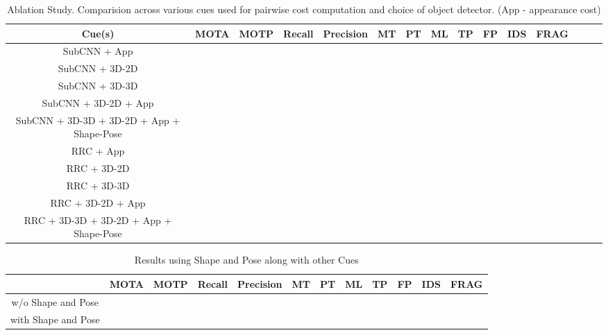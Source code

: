 \documentclass[letterpaper, 10 pt, conference]{ieeeconf}
\begin{document}
\begin{table*}[!hbt]
	\centering
    \caption{Ablation Study. Comparision across various cues used for pairwise cost computation and choice of object detector. (App - appearance cost)}
    \begin{adjustbox}{max width=\linewidth}
	\begin{tabular}{|c|c|c|c|c|c|c|c|c|c|c|c|c|c|c|}
		\hline 
        Cue(s) &  MOTA & MOTP & Recall & Precision & MT & PT & ML & TP & FP & IDS & FRAG \\
      	\hline\hline
        
		SubCNN + App &  &  &  &  &  &  &  &  &  &  &  \\
            \hline
		SubCNN + 3D-2D &  &  &  &  &  &  &  &  &  &  &  \\
             	\hline
		SubCNN + 3D-3D &  &  &  &  &  &  &  &  &  &  &  \\
      \hline
		SubCNN + 3D-2D + App &  &  &  &  &  &  &  &  &  &  &  \\
    	\hline
		SubCNN + 3D-3D + 3D-2D + App + Shape-Pose &  &  &  &  &  &  &  &  &  &  &  \\
        
        \hline\hline
    	
		RRC + App &  &  &  &  &  &  &  &  &  &  &  \\
            \hline
		RRC + 3D-2D &  &  &  &  &  &  &  &  &  &  &  \\
             	\hline
		RRC + 3D-3D &  &  &  &  &  &  &  &  &  &  &  \\
      \hline
		RRC + 3D-2D + App &  &  &  &  &  &  &  &  &  &  &  \\
    	\hline
		RRC + 3D-3D + 3D-2D + App + Shape-Pose &  &  &  &  &  &  &  &  &  &  &  \\
        
        \hline
	\end{tabular}
    \end{adjustbox}
    \label{table:ablation}
\end{table*}




\begin{table*}[!hbt]
	\centering
    \caption{Results using Shape and Pose along with other Cues }
	\begin{tabular}{|c|c|c|c|c|c|c|c|c|c|c|c|}
		\hline\hline
    	 &  MOTA & MOTP & Recall & Precision & MT & PT & ML & TP & FP & IDS & FRAG \\
      	\hline\hline
		w/o Shape and Pose &  &  &  &  &  &  &  &  &  &  &   \\
        \hline
        with Shape and Pose &  &  &  &  &  &  &  &  &  &  &   \\
          
      \hline
 	\end{tabular}
    \label{table:shape_pose}
\end{table*}
\end{document}
